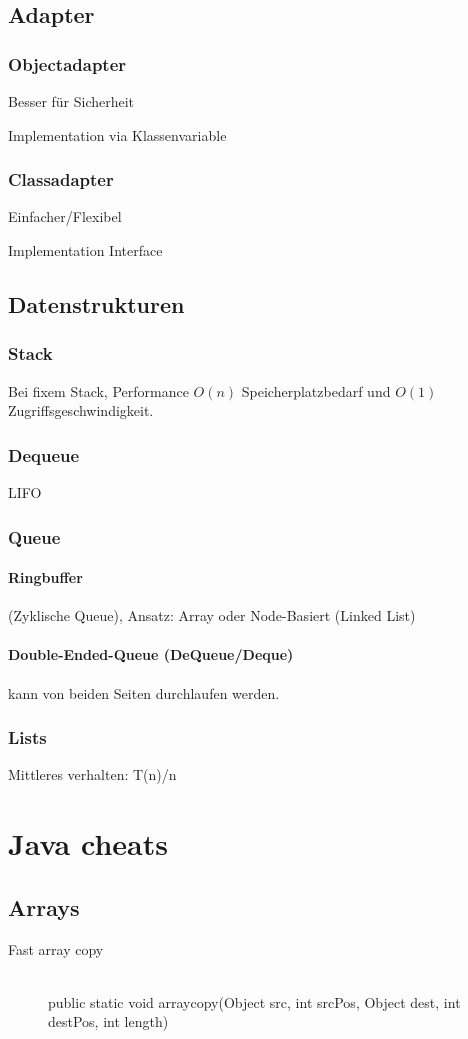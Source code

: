 \subsection{Adapter}
\subsubsection{Objectadapter}

Besser für Sicherheit

Implementation via Klassenvariable

\subsubsection{Classadapter}

Einfacher/Flexibel

Implementation Interface

\subsection{Datenstrukturen}

\subsubsection{Stack}

Bei fixem Stack, Performance $O(n)$ Speicherplatzbedarf und $O(1)$ Zugriffsgeschwindigkeit.

\subsubsection{Dequeue}

LIFO

\subsubsection{Queue}

\paragraph{Ringbuffer} (Zyklische Queue), Ansatz: Array oder Node-Basiert (Linked List)

\paragraph{Double-Ended-Queue (DeQueue/Deque)} kann von beiden Seiten durchlaufen werden.

\subsubsection{Lists}

Mittleres verhalten: T(n)/n



\section{Java cheats}
\subsection{Arrays}
\begin{description}
	
	\item[Fast array copy] \hfill \\
		public static void arraycopy(Object src, int srcPos, Object dest, int destPos, int length)

\end{description}
